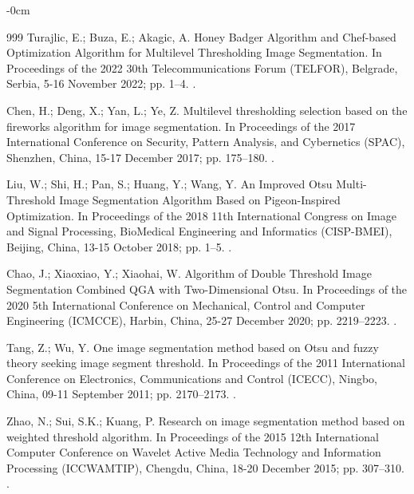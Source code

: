 \documentclass[analytics,article,accept,pdftex,moreauthors]{Definitions/mdpi}
\begin{document}
\begin{adjustwidth}{-\extralength}{0cm}
\begin{thebibliography}{999}
Turajlic, E.; Buza, E.; Akagic, A.
\newblock Honey Badger Algorithm and Chef-based Optimization Algorithm for
  Multilevel Thresholding Image Segmentation.
\newblock In Proceedings of the 2022 30th Telecommunications Forum (TELFOR), Belgrade, Serbia,
5-16 November 2022; pp. 1--4.
.

Chen, H.; Deng, X.; Yan, L.; Ye, Z.
\newblock Multilevel thresholding selection based on the fireworks algorithm
  for image segmentation.
\newblock In Proceedings of the 2017 International Conference on Security,
  Pattern Analysis, and Cybernetics (SPAC), Shenzhen, China, 15-17 December 2017; pp. 175--180.
.

Liu, W.; Shi, H.; Pan, S.; Huang, Y.; Wang, Y.
\newblock An Improved Otsu Multi-Threshold Image Segmentation Algorithm Based
  on Pigeon-Inspired Optimization.
\newblock In Proceedings of the 2018 11th International Congress on Image and
  Signal Processing, BioMedical Engineering and Informatics (CISP-BMEI),  Beijing, China, 13-15 October 2018;
  pp. 1--5.
.

Chao, J.; Xiaoxiao, Y.; Xiaohai, W.
\newblock Algorithm of Double Threshold Image Segmentation Combined QGA with
  Two-Dimensional Otsu.
\newblock In Proceedings of the 2020 5th International Conference on
  Mechanical, Control and Computer Engineering (ICMCCE), Harbin, China, 25-27 December 2020; pp. 2219--2223.
.

Tang, Z.; Wu, Y.
\newblock One image segmentation method based on Otsu and fuzzy theory seeking
  image segment threshold.
\newblock In Proceedings of the 2011 International Conference on Electronics,
  Communications and Control (ICECC), Ningbo, China, 09-11 September 2011; pp. 2170--2173.
.

Zhao, N.; Sui, S.K.; Kuang, P.
\newblock Research on image segmentation method based on weighted threshold
  algorithm.
\newblock In Proceedings of the 2015 12th International Computer Conference on
  Wavelet Active Media Technology and Information Processing (ICCWAMTIP),  Chengdu, China,
18-20 December 2015; pp. 307--310.
.


\end{thebibliography}
\end{adjustwidth}
\end{document}
